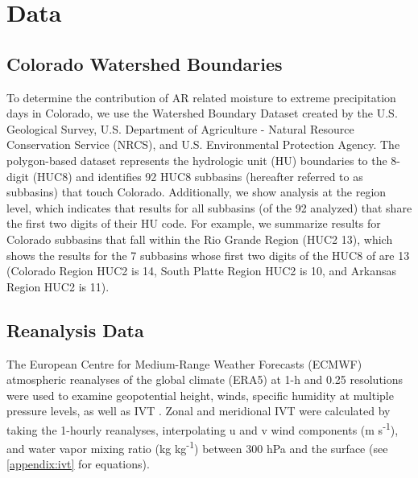 \documentclass[draft]{agujournal2019}
\begin{document}





\section{Data}
\label{sec:data}
\subsection{Colorado Watershed Boundaries}
To determine the contribution of AR related moisture to extreme precipitation days in Colorado, we use the Watershed Boundary Dataset created by the U.S. Geological Survey, U.S. Department of Agriculture - Natural Resource Conservation Service (NRCS), and U.S. Environmental Protection Agency. The polygon-based dataset represents the hydrologic unit (HU) boundaries to the 8-digit (HUC8) and identifies 92 HUC8 subbasins (hereafter referred to as subbasins) that touch Colorado. Additionally, we show analysis at the region level, which indicates that results for all subbasins (of the 92 analyzed) that share the first two digits of their HU code. For example, we summarize results for Colorado subbasins that fall within the Rio Grande Region (HUC2 13), which shows the results for the 7 subbasins whose first two digits of the HUC8 of are 13 (Colorado Region HUC2 is 14, South Platte Region HUC2 is 10, and Arkansas Region HUC2 is 11).

\subsection{Reanalysis Data}

The European Centre for Medium-Range Weather Forecasts (ECMWF) atmospheric reanalyses of the global climate (ERA5) at 1-h and  0.25\textdegree{} resolutions were used to examine geopotential height, winds, specific humidity at multiple pressure levels, as well as IVT \cite{Hersbach2020}. Zonal and meridional IVT were calculated by taking the 1-hourly reanalyses, interpolating u and v wind components (m s\textsuperscript{-1}), and water vapor mixing ratio (kg kg\textsuperscript{-1}) between 300 hPa and the surface (see \ref{appendix:ivt} for equations).
\end{document}
